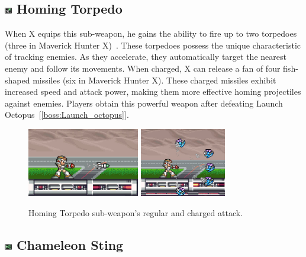 \subsection{\includegraphics[width=12px, height=10px]{figures/X1/weapons/Homig_T.jpg} Homing Torpedo}\label{Homing_torpedo}
When X equips this sub-weapon, he gains the ability to fire up to two torpedoes (three in Maverick Hunter X)~\cite{wiki:Homing_torpedo}. These torpedoes possess the unique characteristic of tracking enemies. As they accelerate, they automatically target the nearest enemy and follow its movements. When charged, X can release a fan of four fish-shaped missiles (six in Maverick Hunter X). These charged missiles exhibit increased speed and attack power, making them more effective homing projectiles against enemies. Players obtain this powerful weapon after defeating Launch Octopus~[\ref{boss:Launch_octopus}].

\begin{figure}[htp]
	\centering
		\includegraphics[height=3cm]{figures/X1/weapons/Homing_torpedo_1.jpg}	
		\includegraphics[height=3cm]{figures/X1/weapons/Homing_torpedo_2.jpg}	
	\caption{Homing Torpedo sub-weapon's regular and charged attack.}
\end{figure}

\subsection{\includegraphics[width=12px, height=10px]{figures/X1/weapons/C_sting.jpg} Chameleon Sting}\label{Chameleon_sting}

